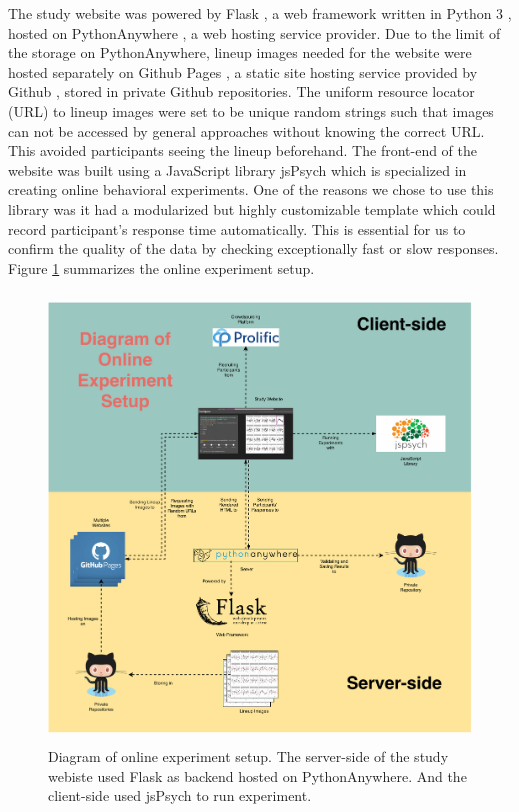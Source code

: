 \documentclass{monashthesis}
\theoremstyle{definition}
\theoremstyle{definition}
\theoremstyle{definition}
\theoremstyle{definition}
\theoremstyle{remark}
\begin{document}
The study website was powered by Flask \autocite{grinberg_flask_2018}, a web framework written in Python 3 \autocite{van_rossum_python_2009}, hosted on PythonAnywhere \autocite{pythonanywhere_pythonanywhere_2022}, a web hosting service provider. Due to the limit of the storage on PythonAnywhere, lineup images needed for the website were hosted separately on Github Pages \autocite{gtihub_github_2022-1}, a static site hosting service provided by Github \autocite{gtihub_github_2022}, stored in private Github repositories. The uniform resource locator (URL) to lineup images were set to be unique random strings such that images can not be accessed by general approaches without knowing the correct URL. This avoided participants seeing the lineup beforehand. The front-end of the website was built using a JavaScript \autocite{flanagan_javascript_2006} library jsPsych \autocite{de_leeuw_jspsych_2015} which is specialized in creating online behavioral experiments. One of the reasons we chose to use this library was it had a modularized but highly customizable template which could record participant's response time automatically. This is essential for us to confirm the quality of the data by checking exceptionally fast or slow responses. Figure \ref{fig:DiagramExperiment} summarizes the online experiment setup.

\begin{figure}
\centering
\includegraphics[width=4.6875in,height=4.6875in]{figures/experiment_tech.pdf}
\caption{Diagram of online experiment setup. The server-side of the study webiste used Flask as backend hosted on PythonAnywhere. And the client-side used jsPsych to run experiment. \label{fig:DiagramExperiment}}
\end{figure}
\end{document}
